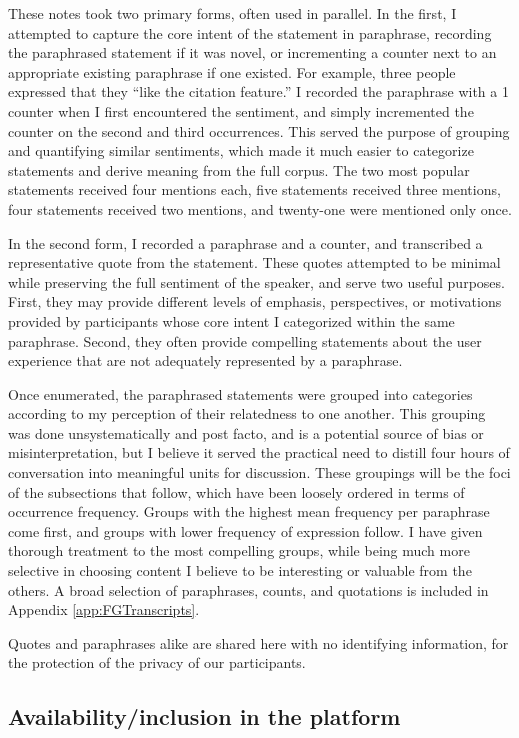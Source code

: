These notes took two primary forms, often used in parallel. In the first, I
attempted to capture the core intent of the statement in paraphrase, recording
the paraphrased statement if it was novel, or incrementing a counter next to an
appropriate existing paraphrase if one existed. For example, three people
expressed that they “like the citation feature.” I recorded the paraphrase with
a 1 counter when I first encountered the sentiment, and simply incremented the
counter on the second and third occurrences. This served the purpose of grouping
and quantifying similar sentiments, which made it much easier to categorize
statements and derive meaning from the full corpus. The two most popular
statements received four mentions each, five statements received three mentions,
four statements received two mentions, and twenty-one were mentioned only once.

In the second form, I recorded a paraphrase and a counter, and transcribed a
representative quote from the statement. These quotes attempted to be minimal
while preserving the full sentiment of the speaker, and serve two useful
purposes. First, they may provide different levels of emphasis, perspectives, or
motivations provided by participants whose core intent I categorized within the
same paraphrase. Second, they often provide compelling statements about the user
experience that are not adequately represented by a paraphrase.

Once enumerated, the paraphrased statements were grouped into categories
according to my perception of their relatedness to one another. This grouping
was done unsystematically and post facto, and is a potential source of bias or
misinterpretation, but I believe it served the practical need to distill four
hours of conversation into meaningful units for discussion. These groupings will
be the foci of the subsections that follow, which have been loosely ordered in
terms of occurrence frequency. Groups with the highest mean frequency per
paraphrase come first, and groups with lower frequency of expression follow. I
have given thorough treatment to the most compelling groups, while being much
more selective in choosing content I believe to be interesting or valuable from
the others. A broad selection of paraphrases, counts, and quotations is included
in Appendix \ref{app:FGTranscripts}.

Quotes and paraphrases alike are shared here with no identifying information,
for the protection of the privacy of our participants.

\subsection{Availability/inclusion in the platform}


